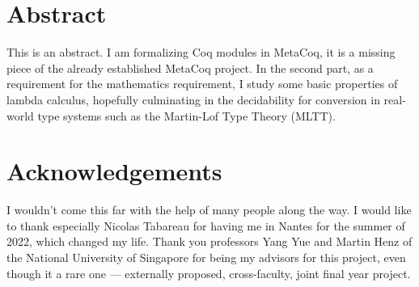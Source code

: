 
\dedication{For Rodolphe and Nicolas, who changed my life}



\maketitle

\begingroup
  \let\cleardoublepage\clearpage
\chapter*{Abstract}

This is an abstract. I am formalizing Coq modules in MetaCoq, it is a missing
piece of the already established MetaCoq project. In the second part, as a
requirement for the mathematics requirement, I study some basic properties of
lambda calculus, hopefully culminating in the decidability for conversion in
real-world type systems such as the Martin-Lof Type Theory (MLTT).

\chapter*{Acknowledgements}

I wouldn't come this far with the help of many people along the way. I would
like to thank especially Nicolas Tabareau for having me in Nantes for the summer
of 2022, which changed my life. Thank you professors Yang Yue and Martin Henz of
the National University of Singapore for being my advisors for this project,
even though it a rare one --- externally proposed, cross-faculty, joint final
year project.

